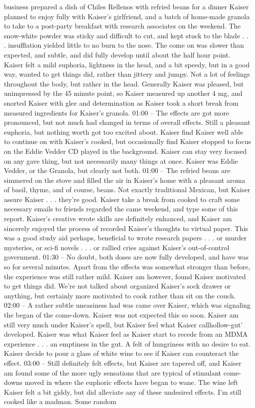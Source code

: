 \documentclass[12pt]{book}
\begin{document}
business prepared a dish of Chiles Rellenos with refried beans for a dinner Kaiser planned to enjoy fully with Kaiser's girlfriend, and a batch of home-made granola to take to a post-party breakfast with research associates on the weekend. The snow-white powder was sticky and difficult to cut, and kept stuck to the blade  . . .  insufflation yielded little to no burn to the nose. The come on was slower than expected, and subtle, and did fully develop until about the half hour point. Kaiser felt a mild euphoria, lightness in the head, and a bit speedy, but in a good way, wanted to get things did, rather than jittery and jumpy. Not a lot of feelings throughout the body, but rather in the head. Generally Kaiser was pleased, but unimpressed by the 45 minute point, so Kaiser measured up another 4 mg, and snorted Kaiser with glee and determination as Kaiser took a short break from measured ingredients for Kaiser's granola. 01:00 -- The effects are got more pronounced, but not much had changed in terms of overall effects. Still a pleasant euphoria, but nothing worth got too excited about. Kaiser find Kaiser well able to continue on with Kaiser's cooked, but occasionally find Kaiser stopped to focus on the Eddie Vedder CD played in the background. Kaiser can stay very focused on any gave thing, but not necessarily many things at once. Kaiser was Eddie Vedder, or the Granola, but clearly not both. 01:00 -- The refried beans are simmered on the stove and filled the air in Kaiser's home with a pleasant aroma of basil, thyme, and of course, beans. Not exactly traditional Mexican, but Kaiser assure Kaiser  . . .  they're good. Kaiser take a break from cooked to craft some necessary emails to friends regarded the came weekend, and type some of this report. Kaiser's creative wrote skills are definitely enhanced, and Kaiser am sincerely enjoyed the process of recorded Kaiser's thoughts to virtual paper. This was a good study aid perhaps, beneficial to wrote research papers  . . .  or murder mysteries, or sci-fi novels  . . .  or rallied cries against Kaiser's out-of-control government. 01:30 -- No doubt, both doses are now fully developed, and have was so for several minutes. Apart from the effects was somewhat stronger than before, the experience was still rather mild. Kaiser am however, found Kaiser motivated to get things did. We're not talked about organized Kaiser's sock drawer or anything, but certainly more motivated to cook rather than sit on the couch. 02:00 -- A rather subtle uneasiness had was came over Kaiser, which was signaling the began of the come-down. Kaiser was not expected this so soon. Kaiser am still very much under Kaiser's spell, but Kaiser feel what Kaiser callhollow-gut' developed. Kaiser was what Kaiser feel as Kaiser start to recede from an MDMA experience  . . .  an emptiness in the gut. A felt of hungriness with no desire to eat. Kaiser decide to pour a glass of white wine to see if Kaiser can counteract the effect. 03:00 -- Still definitely felt effects, but Kaiser are tapered off, and Kaiser am found some of the more ugly sensations that are typical of stimulant come-downs moved in where the euphoric effects have began to wane. The wine left Kaiser felt a bit giddy, but did alleviate any of these undesired effects. I'm still cooked like a madman. Some random 
\end{document}
